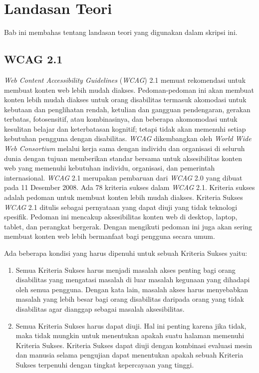 \chapter{Landasan Teori}
\label{chap:teori}

Bab ini membahas tentang landasan teori yang digunakan dalam skripsi ini.

\section{WCAG 2.1}
\label{sec:WCAG2.1} 
\textit{Web Content Accessibility Guidelines} (\textit{WCAG}) 2.1 memuat rekomendasi untuk membuat konten web lebih mudah diakses. Pedoman-pedoman ini akan membuat konten lebih mudah diakses untuk orang disabilitas termasuk akomodasi untuk kebutaan dan penglihatan rendah, ketulian dan gangguan pendengaran, gerakan terbatas, fotosensitif, atau kombinasinya, dan beberapa akomomodasi untuk kesulitan belajar dan keterbatasan kognitif; tetapi tidak akan memenuhi setiap kebutuhan pengguna dengan disabilitas. \textit{WCAG} dikembangkan oleh \textit{World Wide Web Consortium} melalui kerja sama dengan individu dan organisasi di seluruh dunia dengan tujuan memberikan standar bersama untuk aksesibilitas konten web yang memenuhi kebutuhan individu, organisasi, dan pemerintah internasional. \textit{WCAG} 2.1 merupakan pembaruan dari \textit{WCAG} 2.0 yang dibuat pada 11 Desember 2008. Ada 78 kriteria sukses dalam \textit{WCAG} 2.1. Kriteria sukses adalah pedoman untuk membuat konten lebih mudah diakses. Kriteria Sukses \textit{WCAG} 2.1 ditulis sebagai pernyataan yang dapat diuji yang tidak teknologi spesifik. Pedoman ini mencakup aksesibilitas konten web di desktop, laptop, tablet, dan perangkat bergerak. Dengan mengikuti pedoman ini juga akan sering membuat konten web lebih bermanfaat bagi pengguna secara umum.

Ada beberapa kondisi yang harus dipenuhi untuk sebuah Kriteria Sukses yaitu:

\begin{enumerate}
	\item Semua Kriteria Sukses harus menjadi masalah akses penting bagi orang disabilitas yang mengatasi masalah di luar masalah kegunaan yang dihadapi oleh semua pengguna. Dengan kata lain, masalah akses harus menyebabkan masalah yang lebih besar bagi orang disabilitas daripada orang yang tidak disabilitas agar dianggap sebagai masalah aksesibilitas.
	\item Semua Kriteria Sukses harus dapat diuji. Hal ini penting karena jika tidak, maka tidak mungkin untuk menentukan apakah suatu halaman memenuhi Kriteria Sukses. Kriteria Sukses dapat diuji dengan kombinasi evaluasi mesin dan manusia selama pengujian dapat menentukan apakah sebuah Kriteria Sukses terpenuhi dengan tingkat kepercayaan yang tinggi.
\end{enumerate}

